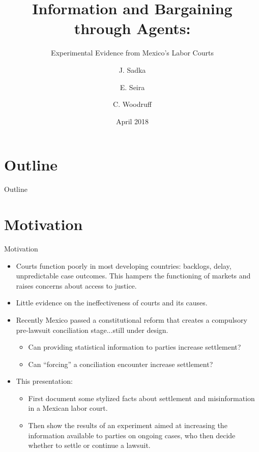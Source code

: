 \documentclass[9pt]{beamer}
\title{Information and Bargaining through Agents: }
\subtitle{Experimental Evidence from Mexico's Labor Courts}
\author{J. Sadka\inst{1} \and E. Seira\inst{2} \and C. Woodruff\inst{3}}
\institute[ITAM, Oxford] %
{
  \inst{1,2}%
  ITAM
  \and
  \inst{3}%
  Oxford
}
\date{April 2018}
\begin{document}
\begin{frame}
  \titlepage
\end{frame}





\section*{Outline}
\begin{frame}{Outline}
\tableofcontents
\end{frame}



\section{Motivation}

\begin{frame}{Motivation}{}
  \begin{itemize}
  \item {Courts function poorly in most developing countries: backlogs, delay, unpredictable case outcomes. This hampers the functioning of markets and raises concerns about access to justice.}
  \vspace{.1in}
  \item {Little evidence on the ineffectiveness of courts and its causes.}
  \vspace{.1in}
  \item{Recently Mexico passed a constitutional reform that creates a compulsory pre-lawsuit  conciliation stage}...still under design.
  \vspace{.1in}
    \begin{itemize}
       \item Can providing statistical information to parties increase settlement?
       \item Can ``forcing'' a conciliation encounter increase settlement?
       \vspace{.05in}
    \end{itemize}
    
    \vspace{.1in}
    \item {This presentation:}
       \begin{itemize}
           \item First document some \alert{stylized facts} about settlement and misinformation in a Mexican labor court.
           \item Then show the results of an \alert{experiment} aimed at increasing the information available to parties on ongoing cases, who then decide whether to settle or continue a lawsuit.
       \end{itemize}
  \end{itemize}
\end{frame}
                  
\end{document}
